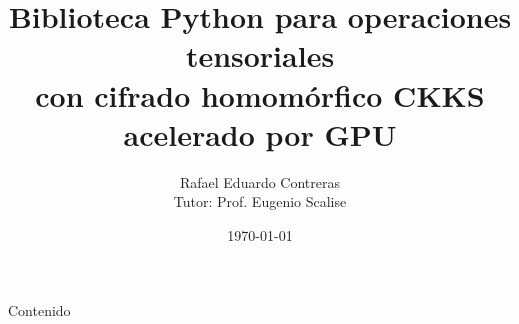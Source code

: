 \documentclass[10pt, spanish, aspectratio=169]{beamer}
\title[OpalML]{Biblioteca Python para operaciones tensoriales\\
con cifrado homomórfico CKKS acelerado por GPU}
\author[Rafael Contreras]{Rafael Eduardo Contreras \\ \small Tutor: Prof. Eugenio Scalise}
\institute{Universidad Central de Venezuela \\ Facultad de Ciencias}
\date{\today}
\begin{document}
\begin{frame}[plain,t]
    \titlepage
\end{frame}

\begin{frame}{Contenido}
    \tableofcontents
\end{frame}







\ThankYouFrame
\end{document}
